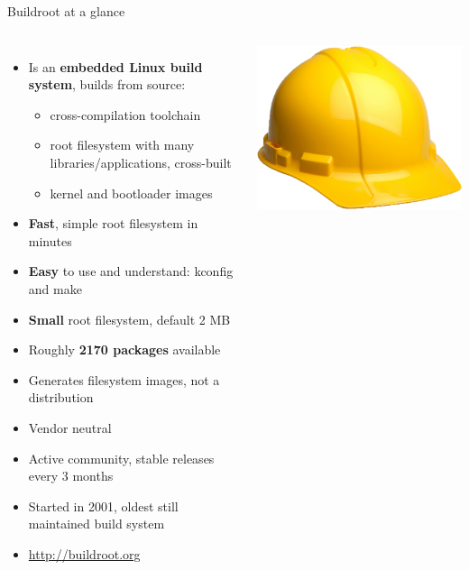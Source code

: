 \documentclass[aspectratio=169,obeyspaces,spaces,hyphens,dvipsnames]{beamer}
\begin{document}
\begin{frame}{Buildroot at a glance}
  \begin{columns}
  \begin{itemize}
  \item Is an {\bf embedded Linux build system}, builds from source:
    \begin{itemize}
    \item cross-compilation toolchain
    \item root filesystem with many libraries/applications, cross-built
    \item kernel and bootloader images
    \end{itemize}
  \item {\bf Fast}, simple root filesystem in minutes
  \item {\bf Easy} to use and understand: kconfig and make
  \item {\bf Small} root filesystem, default 2 MB
  \item Roughly {\bf 2170 packages} available
  \item Generates filesystem images, not a distribution
  \item Vendor neutral
  \item Active community, stable releases every 3 months
  \item Started in 2001, oldest still maintained build system
  \item \url{http://buildroot.org}
  \end{itemize}
  \includegraphics[width=\textwidth]{logo.png}
\end{columns}
\end{frame}
\end{document}

